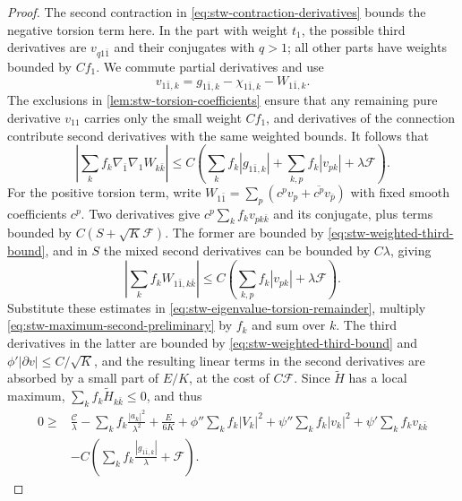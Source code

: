 \begin{proof}
The second contraction in \eqref{eq:stw-contraction-derivatives} bounds the negative torsion term here. In the part with weight $t_1$, the possible third derivatives are $v_{q1\bar1}$ and their conjugates with $q>1$; all other parts have weights bounded by $Cf_1$. We commute partial derivatives and use
\[
 v_{1\bar1,k}=g_{1\bar1,k}-\chi_{1\bar1,k}-W_{1\bar1,k}.
\]
The exclusions in \cref{lem:stw-torsion-coefficients} ensure that any remaining pure derivative $v_{11}$ carries only the small weight $Cf_1$, and derivatives of the connection contribute second derivatives with the same weighted bounds. It follows that
\[
 \left|\sum_k f_k\nabla_{\bar1}\nabla_1W_{k\bar k}\right|
 \leq C\left(\sum_k f_k|g_{1\bar1,k}|
             +\sum_{k,p}f_k|v_{pk}|+\lambda\mathcal F\right).
\]
For the positive torsion term, write $W_{1\bar1}=\sum_p(c^pv_p+\overline{c^p}v_{\bar p})$ with fixed smooth coefficients $c^p$. Two derivatives give $c^p\sum_k f_kv_{pk\bar k}$ and its conjugate, plus terms bounded by $C(S+\sqrt K\mathcal F)$. The former are bounded by \eqref{eq:stw-weighted-third-bound}, and in $S$ the mixed second derivatives can be bounded by $C\lambda$, giving
\[
 \left|\sum_k f_k W_{1\bar1,k\bar k}\right|
       \leq C\left(\sum_{k,p}f_k|v_{pk}|+\lambda\mathcal F\right).
\]
Substitute these estimates in \eqref{eq:stw-eigenvalue-torsion-remainder}, multiply \eqref{eq:stw-maximum-second-preliminary} by $f_k$ and sum over $k$. The third derivatives in the latter are bounded by \eqref{eq:stw-weighted-third-bound} and $\phi'|\partial v|\leq C/\sqrt K$, and the resulting linear terms in the second derivatives are absorbed by a small part of $E/K$, at the cost of $C\mathcal F$. Since $\widetilde H$ has a local maximum, $\sum_kf_k\widetilde H_{k\bar k}\leq0$, and thus
\begin{equation}\label{eq:stw-key-maximum-inequality}
 \begin{split}
 0\geq{}&\frac{\mathcal C}{\lambda}
       -\sum_k f_k\frac{|a_k|^2}{\lambda^2}
       +\frac{E}{6K}+\phi''\sum_k f_k|V_k|^2
       +\psi''\sum_k f_k|v_k|^2+\psi'\sum_k f_kv_{k\bar k}\\
 &-C\left(\sum_k f_k\frac{|g_{1\bar1,k}|}{\lambda}+\mathcal F\right).
 \end{split}
\end{equation}


\end{proof}

